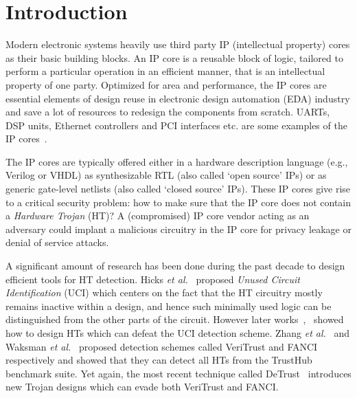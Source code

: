 \documentclass[10pt,journal,compsoc]{IEEEtran}
\begin{document}
\maketitle


\IEEEdisplaynontitleabstractindextext




\IEEEpeerreviewmaketitle


\newtheorem{theorem}{Theorem}
\newtheorem{lemma}{Lemma}
\newtheorem{definition}{Definition}

\section{Introduction} \label{sec:intro}

Modern electronic systems heavily use third party IP (intellectual property) cores as their basic building blocks.
An IP core is a reusable block of logic, tailored to perform a particular operation in an efficient manner, that is an intellectual property of one party.
Optimized for area and performance, the IP cores are essential elements of design reuse in electronic design automation (EDA) industry and save a lot of resources to redesign the components from scratch. 
UARTs, DSP units, Ethernet controllers and PCI interfaces etc. are some examples of the IP cores~\cite{ipcore2}.

The IP cores are typically offered either in a hardware description language (e.g., Verilog or VHDL) as synthesizable RTL (also called `open source' IPs) or as generic gate-level netlists (also called `closed source' IPs).
These IP cores give rise to a critical security problem: how to make sure that the IP core does not contain a \textit{Hardware Trojan} (HT)?
A (compromised) IP core vendor acting as an adversary could implant a malicious circuitry in the IP core for privacy leakage or denial of service attacks.

A significant amount of research has been done during the past decade to design efficient tools for HT detection.
Hicks \textit{et al.}~\cite{sp2010} proposed \textit{Unused Circuit Identification} (UCI) which centers on the fact that the HT circuitry mostly remains inactive within a design, and hence such minimally used logic can be distinguished from the other parts of the circuit.
However later works~\cite{uci_1},~\cite{UCI_sp11} showed how to design HTs which can defeat the UCI detection scheme.
Zhang \textit{et al.}~\cite{veritrust} and Waksman \textit{et al.}~\cite{fanci} proposed detection schemes called VeriTrust and FANCI respectively and showed that they can detect all HTs from the TrustHub~\cite{trust_hub} benchmark suite.
Yet again, the most recent technique called DeTrust~\cite{detrust} introduces new Trojan designs which can evade both VeriTrust and FANCI.
\end{document}
